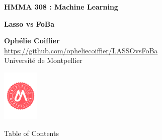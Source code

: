 \documentclass[unknownkeysallowed]{beamer}
\begin{document}



\begin{frame}
\bigskip
\bigskip
\begin{center}{
\LARGE\color{marron}
\textbf{HMMA 308 : Machine Learning}}
\vspace{0.5cm}


\color{marron}
\textbf{Lasso vs FoBa}
\end{center}

\vspace{0.5cm}

\begin{center}
\textbf{Ophélie Coiffier} \\
\vspace{0.1cm}
\url{https://github.com/opheliecoiffier/LASSOvsFoBa}\\
\vspace{0.5cm}
Université de Montpellier \\
\end{center}

\centering
\includegraphics[width=0.13\textwidth]{./images/Logo.pdf}

\end{frame}






\begin{frame}{Table of Contents}
\tableofcontents[hideallsubsections]
\end{frame}
\end{document}
